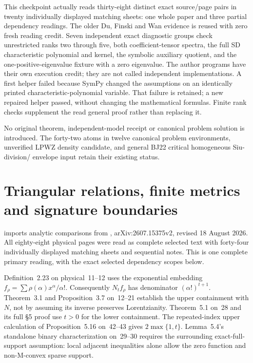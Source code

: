 This checkpoint actually reads thirty-eight distinct exact
source/page pairs in twenty individually displayed matching
sheets: one whole paper and three partial dependency readings.
The older Du, Finski and Wan evidence is reused with zero
fresh reading credit. Seven independent exact diagnostic
groups check unrestricted ranks two through five, both
coefficient-tensor spectra, the full SD characteristic
polynomial and kernel, the symbolic auxiliary quotient, and
the one-positive-eigenvalue fixture with a zero eigenvalue.
The author programs have their own execution credit; they
are not called independent implementations. A first helper
failed because SymPy changed the assumptions on an identically
printed characteristic-polynomial variable. That failure is
retained; a new repaired helper passed, without changing
the mathematical formulas. Finite rank checks supplement
the read general proof rather than replacing it.

No original theorem, independent-model receipt or canonical
problem solution is introduced. The forty-two atoms in twelve
canonical problem environments, unverified LPWZ density
candidate, and general BJ22 critical homogeneous Siu-division/
envelope input retain their existing status.

\section{Triangular relations, finite metrics and signature boundaries}
\label{sec:appL-triangular-analytic-sources}

 imports analytic
comparisons from \cite{BakerHuhKummerLorscheid26AnalyticV2},
arXiv:2607.15375v2, revised 18 August 2026. All eighty-eight
physical pages were read as complete selected text with
forty-four individually displayed matching sheets and
sequential notes. This is one complete primary reading,
with the exact selected dependency scopes below.

Definition~2.23 on physical~11--12 uses the exponential
embedding $f_\rho=\sum\rho(\alpha)x^\alpha/\alpha!$.
Consequently $N_tf_\rho$ has denominator $(\alpha!)^{t+1}$.
Theorem~3.1 and Proposition~3.7 on~12--21 establish the
upper containment with $N$, not by assuming its inverse
preserves Lorentzianity. Theorem~5.1 on~28 and its full
\S5 proof use $t>0$ for the lower containment. The
repeated-index upper calculation of Proposition~5.16
on~42--43 gives $2\max\{1,t\}$. Lemma~5.4's standalone
binary characterization on~29--30 requires the surrounding
exact-full-support assumption: local adjacent inequalities
alone allow the zero function and non-M-convex sparse support.

